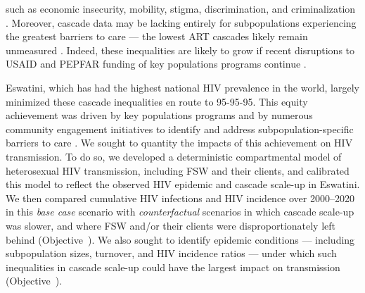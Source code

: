 such as economic insecurity, mobility, stigma, discrimination, and criminalization
\cite{Lancaster2016sr,Wanyenze2016,Schwartz2017,Schmidt-Sane2022}.
Moreover, cascade data may be lacking entirely
for subpopulations experiencing the greatest barriers to care
--- \ie the lowest ART cascades likely remain unmeasured \cite{Hakim2018}.
Indeed, these inequalities are likely to grow if recent disruptions to
USAID and PEPFAR funding of key populations programs continue \cite{KPstate2024}.
\par
Eswatini, which has had the highest national HIV prevalence in the world,
largely minimized these cascade inequalities en route to 95-95-95.
This equity achievement was driven by key populations programs and
by numerous community engagement initiatives to identify and address
subpopulation-specific barriers to care \cite{Walsh2020,SHIMS3,EswIBBS2022}.
We sought to quantity the impacts of this achievement on HIV transmission.
To do so, we developed a deterministic compartmental model
of heterosexual HIV transmission, including FSW and their clients,
and calibrated this model to reflect
the observed HIV epidemic and cascade scale-up in Eswatini.
We then compared cumulative HIV infections and HIV incidence over 2000--2020
in this \emph{base case} scenario
with \emph{counterfactual} scenarios
in which cascade scale-up was slower,
and where FSW and/or their clients were disproportionately left behind
(Objective~).
We also sought to identify epidemic conditions
--- including subpopulation sizes, turnover, and HIV incidence ratios ---
under which such inequalities in cascade scale-up
could have the largest impact on transmission
(Objective~).
